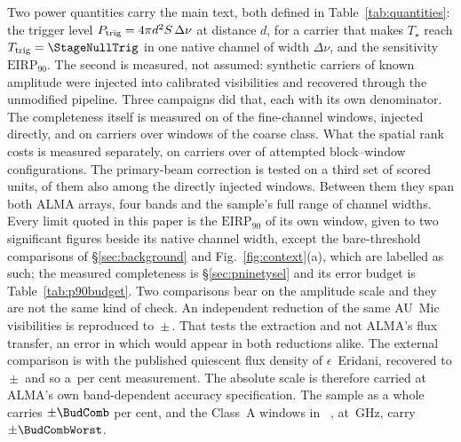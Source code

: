 Two power quantities carry the main text, both defined in
Table~\ref{tab:quantities}: the trigger level $P_{\rm trig} = 4\pi
d^{2}S\,\Delta\nu$ at distance $d$, for a carrier that makes $T_\star$ reach
$T_{\rm trig}=\StageNullTrig$ in one native channel of width $\Delta\nu$,
and the sensitivity $\mathrm{EIRP}_{90}$. The second is measured, not
assumed: synthetic carriers of known amplitude were injected into
calibrated visibilities and recovered through the unmodified pipeline.
Three campaigns did that, each with its own denominator. The completeness
itself is measured on
\MkInjCompWin{} of the \MkInjCompDenom{} fine-channel windows, injected
directly, and on \SensNToneCoarse{} carriers over \SensNInjCoarse{} windows
of the coarse class. What the spatial rank costs is measured separately, on
\SelNTone{} carriers over \MkInjSelUnit{} of \MkInjSelTotal{} attempted
block--window configurations. The primary-beam correction is tested on a
third set of \MkInjBeamUnit{} scored units, \MkInjBeamShared{} of them also
among the directly injected windows. Between them they span both ALMA
arrays, four bands and the sample's full range of
channel widths. Every limit quoted in
this paper is the $\mathrm{EIRP}_{90}$ of its own window, given to two
significant figures beside its native channel width, except the
bare-threshold comparisons of \S\ref{sec:background} and
Fig.~\ref{fig:context}(a), which are labelled as such; the measured
completeness is \S\ref{sec:pninetysel} and its error
budget is Table~\ref{tab:p90budget}. Two comparisons bear on the amplitude
scale and they are not the same kind of check. An independent reduction of the same AU~Mic visibilities is reproduced to
\PxJanRatio\,$\pm$\,\PxJanRatioErr. That tests the extraction and not
ALMA's flux transfer, an error in which would appear in both reductions
alike. The external comparison is with the published quiescent flux density
of $\epsilon$~Eridani, recovered to
\PxEpsRatio\,$\pm$\,\PxEpsRatioErr{} \citep{Burton2022} and so a
\SbEpsPct\,per cent measurement. The absolute scale is therefore carried at ALMA's own band-dependent
accuracy specification. The sample as a whole carries $\pm\BudComb$ per
cent, and the \BudNHiWin{} Class~A windows in
\BudHiBandWord~\BudHiBands, at \BudHiGHzList\,GHz, carry
$\pm\BudCombWorst$.

